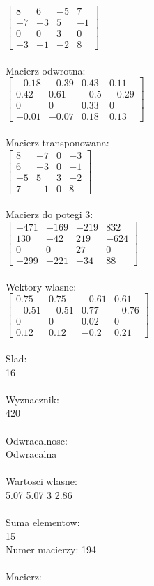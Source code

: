 \documentclass[a4paper,12pt]{article}
\begin{document}
$\begin{bmatrix} 8&6&-5&7\\-7&-3&5&-1\\0&0&3&0\\-3&-1&-2&8 \end{bmatrix}$
\\
\\
Macierz odwrotna:\\

$\begin{bmatrix} -0.18&-0.39&0.43&0.11\\0.42&0.61&-0.5&-0.29\\0&0&0.33&0\\-0.01&-0.07&0.18&0.13 \end{bmatrix}$
\\
\\
Macierz transponowana:\\

$\begin{bmatrix} 8&-7&0&-3\\6&-3&0&-1\\-5&5&3&-2\\7&-1&0&8 \end{bmatrix}$
\\
\\
Macierz do potegi 3:\\

$\begin{bmatrix} -471&-169&-219&832\\130&-42&219&-624\\0&0&27&0\\-299&-221&-34&88 \end{bmatrix}$
\\
\\
Wektory wlasne:\\

$\begin{bmatrix} 0.75&0.75&-0.61&0.61\\-0.51&-0.51&0.77&-0.76\\0&0&0.02&0\\0.12&0.12&-0.2&0.21 \end{bmatrix}$
\\
\\
Slad:\\
16
\\
\\
Wyznacznik:\\
420
\\
\\
Odwracalnosc:\\
Odwracalna
\\
\\
Wartosci wlasne:\\
5.07 5.07 3 2.86
\\
\\
Suma elementow:\\
15
\\
\newpage
Numer macierzy:
194
\\
\\
Macierz:\\
\end{document}
